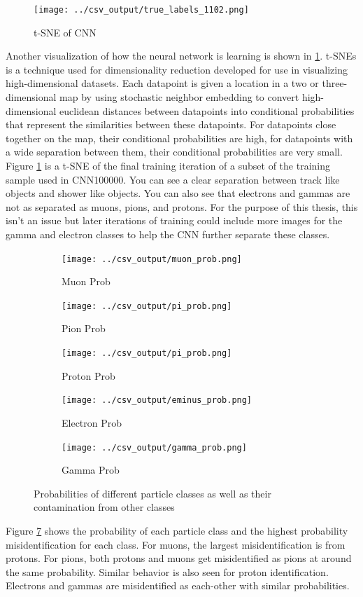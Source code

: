 \begin{figure}[htp!]
\centering
\texttt{[image: ../csv\_output/true\_labels\_1102.png]}
\caption{t-SNE of CNN}
\label{fig:tsne}
\end{figure}
Another visualization of how the neural network is learning is shown in \ref{fig:tsne}.  t-SNEs \cite{tsne} is a technique used for dimensionality reduction developed for use in visualizing high-dimensional datasets. Each datapoint is given a location in a two or three-dimensional map by using stochastic neighbor embedding to convert high-dimensional euclidean distances between datapoints into conditional probabilities that represent the similarities between these datapoints. For datapoints close together on the map, their conditional probabilities are high, for datapoints with a wide separation between them, their conditional probabilities are very small. Figure \ref{fig:tsne} is a t-SNE of the final training iteration of a subset of the training sample used in CNN100000. You can see a clear separation between track like objects and shower like objects. You can also see that electrons and gammas are not as separated as muons, pions, and protons. For the purpose of this thesis, this isn't an issue but later iterations of training could include more images for the gamma and electron classes to help the CNN further separate these classes.


\begin{figure}
\centering
	\begin{subfigure}[b]{.475\textwidth}
		\centering
		\texttt{[image: ../csv\_output/muon\_prob.png]}
		\caption{Muon Prob}
		\label{fig:muonprob}
	\end{subfigure}
	\begin{subfigure}[b]{.475\textwidth}
		\centering
		\texttt{[image: ../csv\_output/pi\_prob.png]}
		\caption{Pion Prob}
		\label{fig:piprob}
	\end{subfigure}
	\begin{subfigure}[b]{.475\textwidth}
		\centering
		\texttt{[image: ../csv\_output/pi\_prob.png]}
		\caption{Proton Prob}
		\label{fig:pprob}
	\end{subfigure}
	\begin{subfigure}[b]{.475\textwidth}
		\centering
		\texttt{[image: ../csv\_output/eminus\_prob.png]}
		\caption{Electron Prob}
		\label{fig:eminusprob}
	\end{subfigure}
	\begin{subfigure}[b]{.475\textwidth}
		\centering
		\texttt{[image: ../csv\_output/gamma\_prob.png]}
		\caption{Gamma Prob}
		\label{fig:gammaprob}
	\end{subfigure}
\caption{Probabilities of different particle classes as well as their contamination from other classes}
\label{fig:particleprob}
\end{figure}
Figure \ref{fig:particleprob} shows the probability of each particle class and the highest probability misidentification for each class. For muons, the largest misidentification is from protons. For pions, both protons and muons get misidentified as pions at around the same probability. Similar behavior is also seen for proton identification. Electrons and gammas are misidentified as each-other with similar probabilities.  




